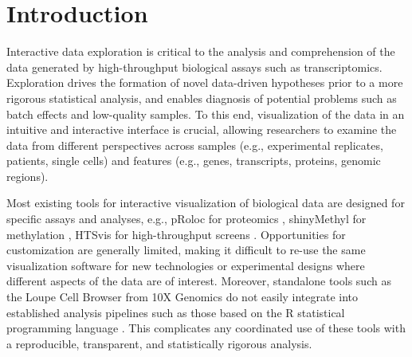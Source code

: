 \documentclass{bioinfo}
\begin{document}
\maketitle

\section{Introduction}
Interactive data exploration is critical to the analysis and comprehension of the data generated by high-throughput biological assays such as transcriptomics.
Exploration drives the formation of novel data-driven hypotheses prior to a more rigorous statistical analysis, and enables diagnosis of potential problems such as batch effects and low-quality samples.
To this end, visualization of the data in an intuitive and interactive interface is crucial, allowing researchers to examine the data from different perspectives across samples (e.g., experimental replicates, patients, single cells) and features (e.g., genes, transcripts, proteins, genomic regions).

Most existing tools for interactive visualization of biological data are designed for specific assays and analyses, e.g., pRoloc for proteomics \citep{gatto2014mass}, shinyMethyl for methylation \citep{fortin2014shinymethyl}, HTSvis for high-throughput screens \citep{scheeder2017htsvis}.
Opportunities for customization are generally limited, making it difficult to re-use the same visualization software for new technologies or experimental designs where different aspects of the data are of interest.
Moreover, standalone tools such as the Loupe Cell Browser from 10X Genomics \citep{zheng2017massively} do not easily integrate into established analysis pipelines such as those based on the R statistical programming language \citep{rcore2008R}.
This complicates any coordinated use of these tools with a reproducible, transparent, and statistically rigorous analysis.
\end{document}
